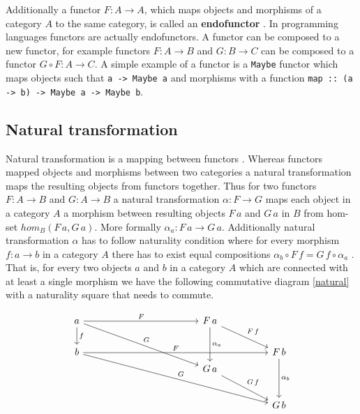 \documentclass[article]{aaltoseries}
\begin{document}
    Additionally a functor $F: A \rightarrow A$, which maps objects and
    morphisms of a category $A$ to the same category, is called an
    \textbf{endofunctor} \cite{computational, barr1990category}. In programming
    languages functors are actually endofunctors. A functor can be composed to a
    new functor, for example functors $F: A \rightarrow B$ and $G: B \rightarrow
    C$ can be composed to a functor $G \circ F: A \rightarrow C$. A simple
    example of a functor is a \lstinline|Maybe| functor which maps objects such
    that \lstinline|a -> Maybe a| and morphisms with a function
    \lstinline|map :: (a -> b) -> Maybe a -> Maybe b|.


  \subsection{Natural transformation}
    Natural transformation is a mapping between functors \cite{computational,
      barr1990category, mac2013categories}. Whereas functors mapped objects and
    morphisms between two categories a natural transformation maps the resulting
    objects from functors together. Thus for two functors $F: A
    \rightarrow B$ and $G: A \rightarrow B$ a natural transformation
    $\alpha: F \rightarrow G$ maps each object in a category $A$ a morphism
    between resulting objects $F\, a$ and $G\, a$ in $B$ from hom-set $hom_B(F\, a,
    G\, a)$. More formally $\alpha_a: F\, a \rightarrow G\, a$. Additionally
    natural transformation $\alpha$ has to follow naturality condition where for
    every morphism $f: a \rightarrow b$ in a category $A$ there has to exist equal
    compositions $\alpha_b \circ F\, f = G\, f \circ \alpha_a$
    \cite{barr1990category, computational, eilenberg1945general}. That is, for
    every two objects $a$ and $b$ in a category $A$ which are connected with at
    least a single morphism we have the following commutative diagram
    \ref{natural} with a naturality square that needs to commute.
    
    \begin{equation}
      \label{natural}
      \begin{tikzcd}[column sep=huge]
        a \arrow[r, "F"] \arrow[d, "f"] \arrow[ddr, "G"]
        &[7em] F\, a \arrow[dd, "\alpha_a"] \arrow[dr, "F\, f"]
        & \\
        b \arrow[rr, "F"] \arrow[ddrr, "G"]
        &
        & F\, b \arrow[dd, "\alpha_b"] \\
        [-1.5em]
        & G\, a \arrow[dr, "G\, f"]
        & \\
        [0.5em]
        &
        & G\, b \\
      \end{tikzcd}
    \end{equation}
\end{document}
